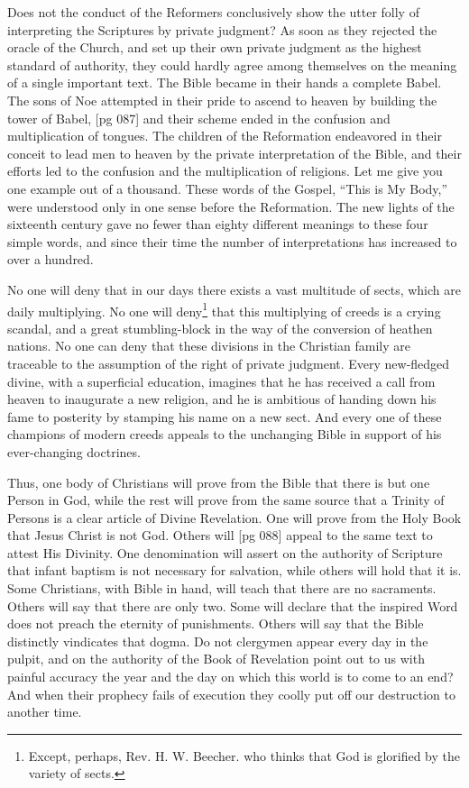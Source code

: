 Does not the conduct of the Reformers conclusively
show the utter folly of interpreting the
Scriptures by private judgment? As soon as they
rejected the oracle of the Church, and set up their
own private judgment as the highest standard of
authority, they could hardly agree among themselves
on the meaning of a single important text.
The Bible became in their hands a complete Babel.
The sons of Noe attempted in their pride to ascend
to heaven by building the tower of Babel,
[pg 087]
and their scheme ended in the confusion and multiplication
of tongues. The children of the Reformation
endeavored in their conceit to lead men
to heaven by the private interpretation of the
Bible, and their efforts led to the confusion and
the multiplication of religions. Let me give you
one example out of a thousand. These words of
the Gospel, “This is My Body,” were understood
only in one sense before the Reformation. The
new lights of the sixteenth century gave no fewer
than eighty different meanings to these four simple
words, and since their time the number of interpretations
has increased to over a hundred.

No one will deny that in our days there exists
a vast multitude of sects, which are daily multiplying.
No one will deny\footnote{Except, perhaps,
Rev. H. W. Beecher. who thinks that God
is glorified by the variety of sects.} that this multiplying
of creeds is a crying scandal, and a great stumbling-block
in the way of the conversion of heathen
nations. No one can deny that these divisions
in the Christian family are traceable to the assumption
of the right of private judgment. Every
new-fledged divine, with a superficial education,
imagines that he has received a call from heaven
to inaugurate a new religion, and he is ambitious
of handing down his fame to posterity by stamping
his name on a new sect. And every one of
these champions of modern creeds appeals to the
unchanging Bible in support of his ever-changing
doctrines.

Thus, one body of Christians will prove from
the Bible that there is but one Person in God,
while the rest will prove from the same source
that a Trinity of Persons is a clear article of
Divine Revelation. One will prove from the Holy
Book that Jesus Christ is not God. Others will
[pg 088]
appeal to the same text to attest His Divinity.
One denomination will assert on the authority of
Scripture that infant baptism is not necessary
for salvation, while others will hold that it is.
Some Christians, with Bible in hand, will teach
that there are no sacraments. Others will say
that there are only two. Some will declare that
the inspired Word does not preach the eternity
of punishments. Others will say that the Bible
distinctly vindicates that dogma. Do not clergymen
appear every day in the pulpit, and on the
authority of the Book of Revelation point out to
us with painful accuracy the year and the day on
which this world is to come to an end? And when
their prophecy fails of execution they coolly put
off our destruction to another time.

